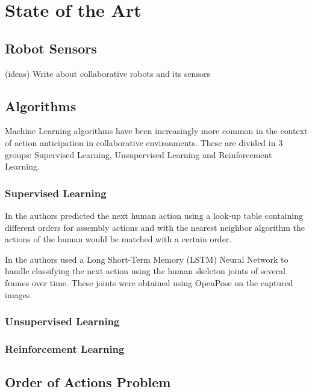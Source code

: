 \chapter{State of the Art}
\label{chapter:state_of_the_art}

\section{Robot Sensors}

{\color{gray}
(ideas) Write about collaborative robots and its sensors
}

\section{Algorithms}

Machine Learning algorithms have been increasingly more common in the context of action anticipation in collaborative environments. These are divided in 3 groups: Supervised Learning, Unsupervised Learning and Reinforcement Learning.

\subsection{Supervised Learning}

In \cite{Maeda2016} the authors predicted the next human action using a look-up table containing different orders for assembly actions and with the nearest neighbor algorithm the actions of the human would be matched with a certain order.

In \cite{Canuto2021} the authors used a Long Short-Term Memory (LSTM) Neural Network to handle classifying the next action using the human skeleton joints of several frames over time. These joints were obtained using OpenPose on the captured images.

\subsection{Unsupervised Learning}

\subsection{Reinforcement Learning}

\section{Order of Actions Problem}

